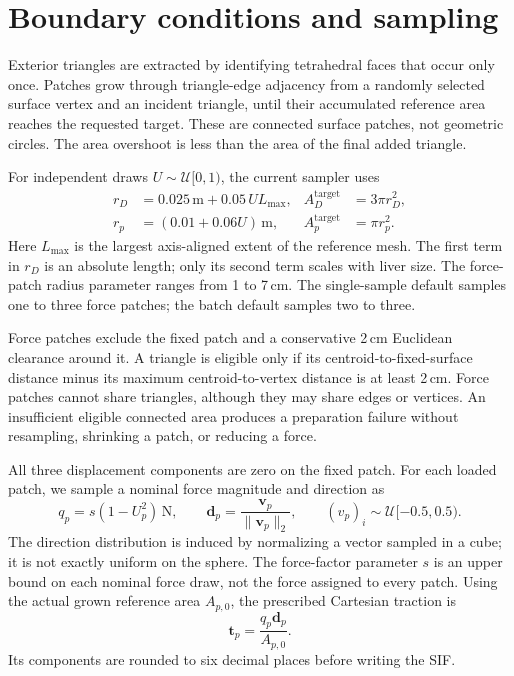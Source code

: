 \documentclass[11pt]{article}
\newcommand{\vect}[1]{\boldsymbol{#1}}
\begin{document}
\section{Boundary conditions and sampling}
Exterior triangles are extracted by identifying tetrahedral faces that occur
only once. Patches grow through triangle-edge adjacency from a randomly selected
surface vertex and an incident triangle, until their accumulated reference area
reaches the requested target. These are connected surface patches, not geometric
circles. The area overshoot is less than the area of the final added triangle.

For independent draws $U\sim\mathcal{U}[0,1)$, the current sampler uses
\begin{align}
 r_D &= 0.025\,\mathrm{m}+0.05\,U L_{\max}, & A_D^{\mathrm{target}}&=3\pi r_D^2,\\
 r_p &= (0.01+0.06U)\,\mathrm{m}, & A_p^{\mathrm{target}}&=\pi r_p^2.
\end{align}
Here $L_{\max}$ is the largest axis-aligned extent of the reference mesh. The
first term in $r_D$ is an absolute length; only its second term scales with liver
size. The force-patch radius parameter ranges from 1 to 7\,cm. The single-sample
default samples one to three force patches; the batch default samples two to three.

Force patches exclude the fixed patch and a conservative 2\,cm Euclidean
clearance around it. A triangle is eligible only if its centroid-to-fixed-surface
distance minus its maximum centroid-to-vertex distance is at least 2\,cm.
Force patches cannot share triangles, although they may share edges or vertices.
An insufficient eligible connected area produces a preparation failure without
resampling, shrinking a patch, or reducing a force.

All three displacement components are zero on the fixed patch. For each loaded
patch, we sample a nominal force magnitude and direction as
\begin{equation}
 q_p=s(1-U_p^2)\,\mathrm{N},\qquad
 \vect{d}_p=\frac{\vect{v}_p}{\|\vect{v}_p\|_2},\qquad
 (v_p)_i\sim\mathcal{U}[-0.5,0.5).
\end{equation}
The direction distribution is induced by normalizing a vector sampled in a cube;
it is not exactly uniform on the sphere. The force-factor parameter $s$ is an
upper bound on each nominal force draw, not the force assigned to every patch.
Using the actual grown reference area $A_{p,0}$, the prescribed Cartesian traction is
\begin{equation}
 \vect{t}_p=\frac{q_p\vect{d}_p}{A_{p,0}}.
 \label{eq:traction}
\end{equation}
Its components are rounded to six decimal places before writing the SIF.
\end{document}
